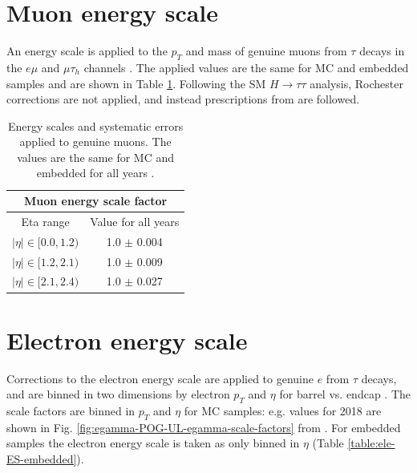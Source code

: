 \section{Muon energy scale}
An energy scale is applied to the $p_{T}$ and mass of genuine muons from $\tau$ decays in the $e\mu$ and $\mu\tau_{h}$ channels \cite{twiki_MUON_POG_recommendation}. The applied values are the same for MC and embedded samples and are shown in Table \ref{table:muon-ES}. Following the SM $H \rightarrow \tau\tau$ analysis, Rochester corrections are not applied, and instead prescriptions from \cite{twiki_MUO_simplified_ES} are followed.


\begin{table}[ht]
    \centering
    \begin{tabular}{|c|c|}
    \hline
    \multicolumn{2}{|c|}{Muon energy scale factor}      \\ \hline
    \hline
    Eta range                & Value for all years \\ \hline
    $|\eta| \in [0.0, 1.2)$  & 1.0 $\pm$ 0.004 \\
    $|\eta| \in [1.2, 2.1)$  & 1.0 $\pm$ 0.009 \\
    $|\eta| \in [2.1, 2.4)$  & 1.0 $\pm$ 0.027 \\
    \hline
    \end{tabular}
    \caption[Energy scales and systematic errors applied to genuine muons.]{Energy scales and systematic errors applied to genuine muons. The values are the same for MC and embedded for all years \cite{twiki_HiggsToTauTauWorkingLegacyRun2} \cite{twiki_MUO_simplified_ES}.}
    \label{table:muon-ES}
\end{table}


\section{Electron energy scale}
Corrections to the electron energy scale are applied to genuine $e$ from $\tau$ decays, and are binned in two dimensions by electron $p_{T}$ and $\eta$ for barrel vs. endcap \cite{twiki_Electron_POG_recommendation}. The scale factors are binned in $p_{T}$ and $\eta$ for MC samples: e.g. values for 2018 are shown in Fig. \ref{fig:egamma-POG-UL-egamma-scale-factors} from \cite{twiki_Electron_UL_2016_2017_2018}. For embedded samples the electron energy scale is taken as only binned in $\eta$ (Table \ref{table:ele-ES-embedded}).

